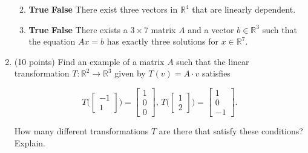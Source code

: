 \documentclass[12 pt]{report}
\begin{document}
\begin{enumerate}
\begin{enumerate}
\vfill 

\item \textbf{True} \hspace{5pt} \textbf{False} \hspace{5pt} There exist three vectors in $\mathbb{R}^4$ that are linearly dependent. 

\vfill 

\item \textbf{True} \hspace{5pt} \textbf{False} \hspace{5pt} There exists a $3 \times 7$ matrix $A$ and a vector $b \in \mathbb{R}^3$ such that the equation $Ax = b$ has exactly three solutions for $x \in \mathbb{R}^7$. 

\vfill 

\end{enumerate}

\newpage

\item (10 points) Find an example of a matrix $A$ such that the linear transformation $T: \mathbb{R}^2 \to \mathbb{R}^3$ given by $T(v) = A \cdot v$ satisfies 

\[
T\Big( \begin{bmatrix} -1 \\ 1 \end{bmatrix}\Big) = \begin{bmatrix} 1 \\ 0 \\ 0 \end{bmatrix}, \, T\Big( \begin{bmatrix} 1 \\ 2 \end{bmatrix}\Big) = \begin{bmatrix} 1 \\ 0 \\ -1 \end{bmatrix}.
\]

How many different transformations $T$ are there that satisfy these conditions? Explain. 
\end{enumerate}
\end{document}
